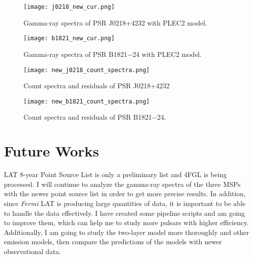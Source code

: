 \documentclass[a4paper, 12pt]{report}
\begin{document}
    \begin{figure}[!htp]
      \centering 
      \texttt{[image: j0218\_new\_cur.png]}
      \caption{Gamma-ray spectra of PSR J0218+4232 with PLEC2 model.}
      \label{fig: j0218_new_cur}
    \end{figure}

    \begin{figure}[!htp]
      \centering 
      \texttt{[image: b1821\_new\_cur.png]}
      \caption{Gamma-ray spectra of PSR B1821$-$24 with PLEC2 model.}
      \label{fig: b1821_new_cur}
    \end{figure}


    \begin{figure}[!htp]
      \centering 
      \texttt{[image: new\_j0218\_count\_spectra.png]}
      \caption{Count spectra and residuals of PSR J0218+4232}
      \label{fig: new_j0218_count_spectra}
    \end{figure}

    \begin{figure}[!htp]
      \centering 
      \texttt{[image: new\_b1821\_count\_spectra.png]}
      \caption{Count spectra and residuals of PSR B1821$-$24.}
      \label{fig: new_b1821_count_spectra}
    \end{figure}
    

    \section{Future Works}
      LAT 8-year Point Source List is only a preliminary list and 4FGL is being processed. 
      I will continue to analyze the gamma-ray spectra of the three MSPs with the 
      newer point source list in order to get more precise results. In addition, since 
      \textit{Fermi} LAT is producing large quantities of data, it is important to be able 
      to handle the data effectively. I have created some pipeline scripts and am going to
      improve them, which can help me to study more pulsars with higher efficiency.
      Additionally, I am going to study the two-layer model more thoroughly and other 
      emission models, then compare the predictions of the models with newer observational data.





\printbibliography
 
\end{document}
